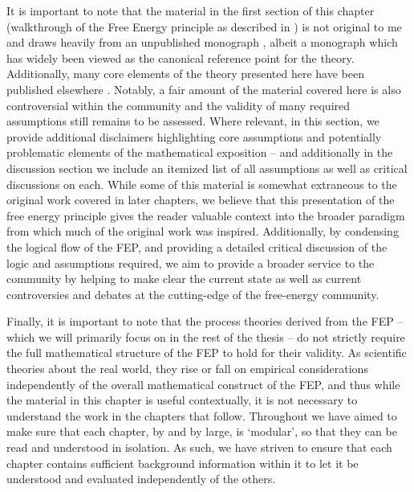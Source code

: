 It is important to note that the material in the first section of this chapter (walkthrough of the Free Energy principle as described in \citet{friston2019particularphysics}) is not original to me and draws heavily from an unpublished monograph \citep{friston2019particularphysics}, albeit a monograph which has widely been viewed as the canonical reference point for the theory. Additionally, many core elements of the theory presented here have been published elsewhere \citep{friston2013life, friston2020some,parr2020markov,friston2020sentience}. Notably, a fair amount of the material covered here is also controversial within the community and the validity of many required assumptions still remains to be assessed. Where relevant, in this section,  we provide additional disclaimers highlighting core assumptions and potentially problematic elements of the mathematical exposition -- and additionally in the discussion section we include an itemized list of all assumptions as well as critical discussions on each. While some of this material is somewhat extraneous to the original work covered in later chapters, we believe that this presentation of the free energy principle gives the reader valuable context into the broader paradigm from which much of the original work was inspired. Additionally, by condensing the logical flow of the FEP, and providing a detailed critical discussion of the logic and assumptions required, we aim to provide a broader service to the community by helping to make clear the current state as well as current controversies and debates at the cutting-edge of the free-energy community.

Finally, it is important to note that the process theories derived from the FEP -- which we will primarily focus on in the rest of the thesis -- do not strictly require the full mathematical structure of the FEP to hold for their validity. As scientific theories about the real world, they rise or fall on empirical considerations independently of the overall mathematical construct of the FEP, and thus while the material in this chapter is useful contextually, it is not necessary to understand the work in the chapters that follow. Throughout we have aimed to make sure that each chapter, by and by large, is `modular', so that they can be read and understood in isolation. As such, we have striven to ensure that each chapter contains sufficient background information within it to let it be understood and evaluated independently of the others.


